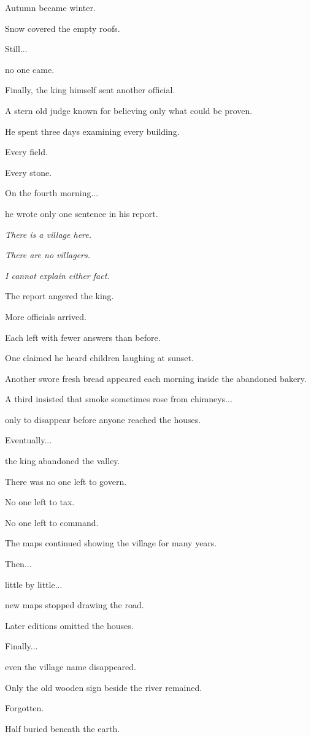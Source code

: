 \documentclass[12pt,openany]{book}
\begin{document}
Autumn became winter.

Snow covered the empty roofs.

Still...

no one came.

Finally, the king himself sent another official.

A stern old judge known for believing only what could be proven.

He spent three days examining every building.

Every field.

Every stone.

On the fourth morning...

he wrote only one sentence in his report.

\emph{There is a village here.}

\emph{There are no villagers.}

\emph{I cannot explain either fact.}

The report angered the king.

More officials arrived.

Each left with fewer answers than before.

One claimed he heard children laughing at sunset.

Another swore fresh bread appeared each morning inside the abandoned bakery.

A third insisted that smoke sometimes rose from chimneys...

only to disappear before anyone reached the houses.

Eventually...

the king abandoned the valley.

There was no one left to govern.

No one left to tax.

No one left to command.

The maps continued showing the village for many years.

Then...

little by little...

new maps stopped drawing the road.

Later editions omitted the houses.

Finally...

even the village name disappeared.

Only the old wooden sign beside the river remained.

Forgotten.

Half buried beneath the earth.
\end{document}
